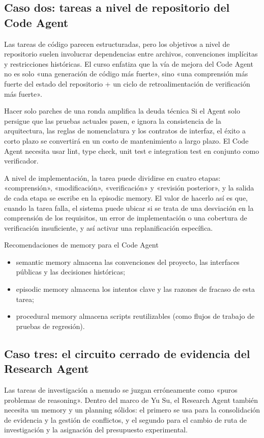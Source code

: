 \subsection{Caso dos: tareas a nivel de repositorio del Code Agent}
Las tareas de código parecen estructuradas, pero los objetivos a nivel de repositorio suelen involucrar dependencias entre archivos, convenciones implícitas y restricciones históricas. El curso enfatiza que la vía de mejora del Code Agent no es solo «una generación de código más fuerte», sino «una comprensión más fuerte del estado del repositorio + un ciclo de retroalimentación de verificación más fuerte».

\begin{warningbox}{Hacer solo parches de una ronda amplifica la deuda técnica}
Si el Agent solo persigue que las pruebas actuales pasen, e ignora la consistencia de la arquitectura, las reglas de nomenclatura y los contratos de interfaz, el éxito a corto plazo se convertirá en un costo de mantenimiento a largo plazo. El Code Agent necesita usar lint, type check, unit test e integration test en conjunto como verificador.
\end{warningbox}

A nivel de implementación, la tarea puede dividirse en cuatro etapas: «comprensión», «modificación», «verificación» y «revisión posterior», y la salida de cada etapa se escribe en la episodic memory. El valor de hacerlo así es que, cuando la tarea falla, el sistema puede ubicar si se trata de una desviación en la comprensión de los requisitos, un error de implementación o una cobertura de verificación insuficiente, y así activar una replanificación específica.

\begin{knowledgebox}{Recomendaciones de memory para el Code Agent}
\begin{itemize}
    \item semantic memory almacena las convenciones del proyecto, las interfaces públicas y las decisiones históricas;
    \item episodic memory almacena los intentos clave y las razones de fracaso de esta tarea;
    \item procedural memory almacena scripts reutilizables (como flujos de trabajo de pruebas de regresión).
\end{itemize}
\end{knowledgebox}

\subsection{Caso tres: el circuito cerrado de evidencia del Research Agent}
Las tareas de investigación a menudo se juzgan erróneamente como «puros problemas de reasoning». Dentro del marco de Yu Su, el Research Agent también necesita un memory y un planning sólidos: el primero se usa para la consolidación de evidencia y la gestión de conflictos, y el segundo para el cambio de ruta de investigación y la asignación del presupuesto experimental.

